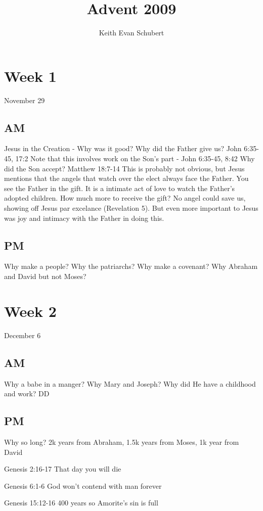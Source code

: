 \documentclass{article}
\author{Keith Evan Schubert}
\title{Advent 2009}
\begin{document}
\maketitle

\section{Week 1}
November 29

\subsection{AM}
  Jesus in the Creation - Why was it good?  Why did the Father give us? John 6:35-45, 17:2  Note that this involves work on the Son's part - John 6:35-45, 8:42  Why did the Son accept?  Matthew 18:7-14 This is probably not obvious, but Jesus mentions that the angels that watch over the elect always face the Father.  You see the Father in the gift.  It is a intimate act of love to watch the Father's adopted children.  How much more to receive the gift?  No angel could save us, showing off Jesus par excelance (Revelation 5).  But even more important to Jesus was joy and intimacy with the Father in doing this.

\subsection{PM}  Why make a people?  Why the patriarchs?  Why make a covenant?  Why Abraham and David but not Moses?

\section{Week 2}
December 6

\subsection{AM}  Why a babe in a manger?  Why Mary and Joseph?  Why did He have a childhood and work? DD

\subsection{PM}  Why so long?  2k years from Abraham, 1.5k years from Moses, 1k year from David

Genesis 2:16-17  That day you will die

Genesis 6:1-6    God won't contend with man forever

Genesis 15:12-16  400 years so Amorite's sin is full
\end{document}
